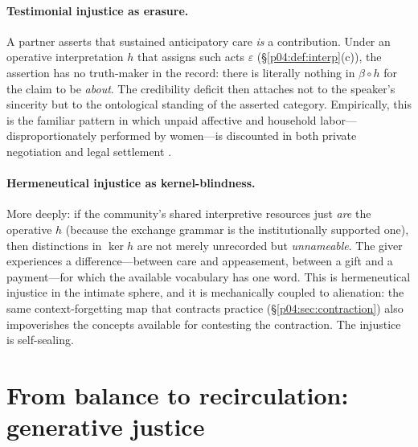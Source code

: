 \paragraph{Testimonial injustice as erasure.}
A partner asserts that sustained anticipatory care \emph{is} a contribution.
Under an operative interpretation $h$ that assigns such acts $\varepsilon$
(\S\ref{p04:def:interp}(c)), the assertion has no truth-maker in the record:
there is literally nothing in $\beta\circ h$ for the claim to be \emph{about}.
The credibility deficit then attaches not to the speaker's sincerity but to
the ontological standing of the asserted category. Empirically, this is the
familiar pattern in which unpaid affective and household labor---
disproportionately performed by women---is discounted in both private
negotiation and legal settlement \parencite{folbre2001}.

\paragraph{Hermeneutical injustice as kernel-blindness.}
More deeply: if the community's shared interpretive resources just \emph{are}
the operative $h$ (because the exchange grammar is the institutionally
supported one), then distinctions in $\ker h$ are not merely unrecorded but
\emph{unnameable}. The giver experiences a difference---between care and
appeasement, between a gift and a payment---for which the available
vocabulary has one word. This is hermeneutical injustice in the intimate
sphere, and it is mechanically coupled to alienation: the same
context-forgetting map that contracts practice (\S\ref{p04:sec:contraction}) also
impoverishes the concepts available for contesting the contraction. The
injustice is self-sealing.

\section{From balance to recirculation: generative justice}
\label{p04:sec:generative}

